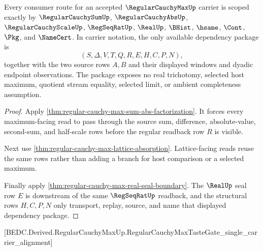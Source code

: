 \begin{theorem}
\label{thm:regular-cauchy-max-scoped-dependency-package}
Every consumer route for an accepted $\RegularCauchyMaxUp$ carrier is scoped exactly by $\RegularCauchySumUp$, $\RegularCauchyAbsUp$, $\RegularCauchyScaleUp$, $\RegSeqRatUp$, $\RealUp$, $\BHist$, $\hsame$, $\Cont$, $\Pkg$, and $\NameCert$. In carrier notation, the only available dependency package is
$$
(S,\Delta,V,T,Q,R,E,H,C,P,N),
$$
together with the two source rows $A,B$ and their displayed windows and dyadic endpoint observations. The package exposes no real trichotomy, selected host maximum, quotient stream equality, selected limit, or ambient completeness assumption.
\end{theorem}
\begin{proof}
Apply \autoref{thm:regular-cauchy-max-sum-abs-factorization}. It forces every maximum-facing read to pass through the source sum, difference, absolute-value, second-sum, and half-scale rows before the regular readback row $R$ is visible.

Next use \autoref{thm:regular-cauchy-max-lattice-absorption}. Lattice-facing reads reuse the same rows rather than adding a branch for host comparison or a selected maximum.

Finally apply \autoref{thm:regular-cauchy-max-real-seal-boundary}. The $\RealUp$ seal row $E$ is downstream of the same $\RegSeqRatUp$ readback, and the structural rows $H,C,P,N$ only transport, replay, source, and name that displayed dependency package.
\end{proof}

[BEDC.Derived.RegularCauchyMaxUp.RegularCauchyMaxTasteGate\_single\_carrier\_alignment]

\begin{closurestatus}{\RegularCauchyMaxUp}
  \theoryclosure{\scopedClosure}
  \formalstatus{\axiomCleanV}
\end{closurestatus}
